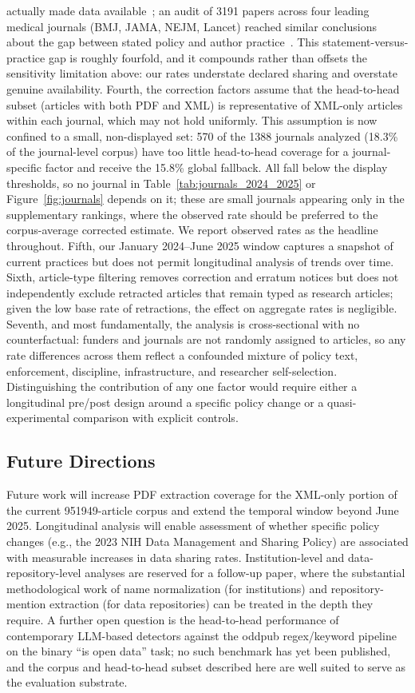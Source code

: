 actually made data available~\cite{Hamilton2023-yz}; an audit of \num{3191} papers across four leading medical journals (BMJ, JAMA, NEJM, Lancet) reached similar conclusions about the gap between stated policy and author practice~\cite{Li2024-mw}. This statement-versus-practice gap is roughly fourfold, and it compounds rather than offsets the sensitivity limitation above: our rates understate declared sharing and overstate genuine availability. Fourth, the correction factors assume that the head-to-head subset (articles with both PDF and XML) is representative of XML-only articles within each journal, which may not hold uniformly. This assumption is now confined to a small, non-displayed set: 570 of the \num{1388} journals analyzed (18.3\% of the journal-level corpus) have too little head-to-head coverage for a journal-specific factor and receive the 15.8\% global fallback. All fall below the display thresholds, so no journal in Table~\ref{tab:journals_2024_2025} or Figure~\ref{fig:journals} depends on it; these are small journals appearing only in the supplementary rankings, where the observed rate should be preferred to the corpus-average corrected estimate. We report observed rates as the headline throughout. Fifth, our January 2024--June 2025 window captures a snapshot of current practices but does not permit longitudinal analysis of trends over time. Sixth, article-type filtering removes correction and erratum notices but does not independently exclude retracted articles that remain typed as research articles; given the low base rate of retractions, the effect on aggregate rates is negligible. Seventh, and most fundamentally, the analysis is cross-sectional with no counterfactual: funders and journals are not randomly assigned to articles, so any rate differences across them reflect a confounded mixture of policy text, enforcement, discipline, infrastructure, and researcher self-selection. Distinguishing the contribution of any one factor would require either a longitudinal pre/post design around a specific policy change or a quasi-experimental comparison with explicit controls.

\subsection{Future Directions}

Future work will increase PDF extraction coverage for the XML-only portion of the current \num{951949}-article corpus and extend the temporal window beyond June 2025. Longitudinal analysis will enable assessment of whether specific policy changes (e.g., the 2023 NIH Data Management and Sharing Policy) are associated with measurable increases in data sharing rates. Institution-level and data-repository-level analyses are reserved for a follow-up paper, where the substantial methodological work of name normalization (for institutions) and repository-mention extraction (for data repositories) can be treated in the depth they require. A further open question is the head-to-head performance of contemporary LLM-based detectors against the oddpub regex/keyword pipeline on the binary ``is open data'' task; no such benchmark has yet been published, and the corpus and head-to-head subset described here are well suited to serve as the evaluation substrate.


